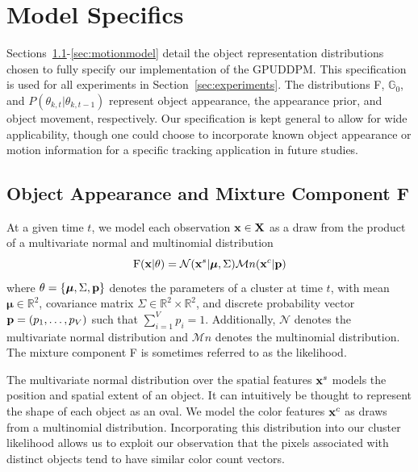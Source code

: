 \documentclass{article}
\begin{document}

\section{Model Specifics}
\label{sec:modelspecification}

Sections~\ref{sec:objectappearance}-\ref{sec:motionmodel} detail the object representation distributions chosen to fully specify our implementation of the GPUDDPM. This specification is used for all experiments in Section~\ref{sec:experiments}. The distributions F, $\mathbb{G}_{0}$, and $P(\theta_{k, t} | \theta_{k, t-1})$ represent object appearance, the appearance prior, and object movement, respectively. Our specification is kept general to allow for wide applicability, though one could choose to incorporate known object appearance or motion information for a specific tracking application in future studies.


\subsection{Object Appearance and Mixture Component F}
\label{sec:objectappearance}

At a given time $t$, we model each observation $\bold{x} \in \bold{X}$ as a draw from the product of a multivariate normal and multinomial distribution
\begin{equation}
\label{likelihood}
\text{F}(\bold{x}|\theta) = \mathcal{N}(\bold{x}^{s} | \boldsymbol{\mu}, \Sigma)  \mathcal{M}n(\bold{x}^{c} | \bold{p})
\end{equation}
where $\theta = \{ \boldsymbol{\mu}, \Sigma, \bold{p} \}$ denotes the parameters of a cluster at time $t$, with mean $\boldsymbol{\mu} \in \mathbb{R}^{2}$, covariance matrix $\Sigma \in \mathbb{R}^{2} \times \mathbb{R}^{2}$, and discrete probability vector $\bold{p} = (p_{1}, \ldots, p_{V})$ such that $\sum_{i=1}^{V}p_{i} = 1$. Additionally, $\mathcal{N}$ denotes the multivariate normal distribution and $\mathcal{M}n$ denotes the multinomial distribution. The mixture component F is sometimes referred to as the likelihood.

The multivariate normal distribution over the spatial features $\bold{x}^{s}$ models the position and spatial extent of an object. It can intuitively be thought to represent the shape of each object as an oval. We model the color features $\bold{x}^{c}$ as draws from a multinomial distribution. Incorporating this distribution into our cluster likelihood allows us to exploit our observation that the pixels associated with distinct objects tend to have similar color count vectors.
\end{document}
